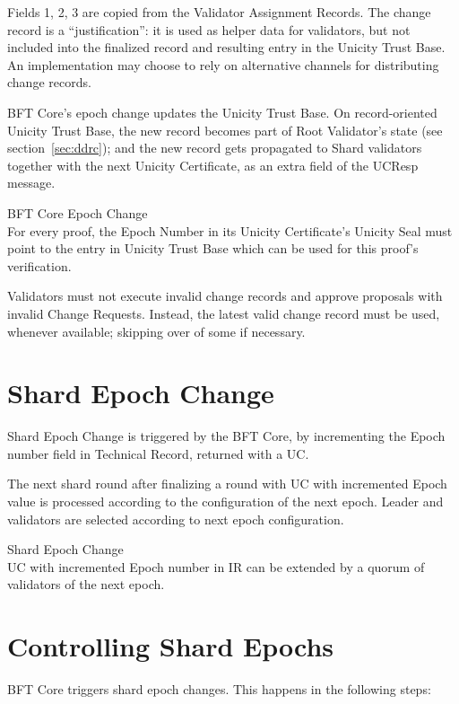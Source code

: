 Fields 1, 2, 3 are copied from the Validator Assignment Records. The change record is a ``justification'': it is used as helper data for validators, but not included into the finalized record and resulting entry in the Unicity Trust Base. An implementation may choose to rely on alternative channels for distributing change records.

BFT Core's epoch change updates the Unicity Trust Base. On record-oriented Unicity Trust Base, the new record becomes part of Root Validator's state (see section~\ref{sec:ddrc}); and the new record gets propagated to Shard validators together with the next Unicity Certificate, as an extra field of the UCResp message.

\begin{ruledef*}{BFT Core Epoch Change} \\
  For every proof, the Epoch Number in its Unicity Certificate's Unicity Seal must point to the entry in Unicity Trust Base which can be used for this proof's verification.
\end{ruledef*}

Validators must not execute invalid change records and approve proposals with invalid Change Requests. Instead, the latest valid change record must be used, whenever available; skipping over of some if necessary.


\section{Shard Epoch Change}

Shard Epoch Change is triggered by the BFT Core, by incrementing the Epoch number field in Technical Record, returned with a UC.

The next shard round after finalizing a round with UC with incremented Epoch value is processed according to the configuration of the next epoch. Leader and validators are selected according to next epoch configuration.

\begin{ruledef*}{Shard Epoch Change} \\
  UC with incremented Epoch number in IR can be extended by a quorum of validators of the next epoch.
\end{ruledef*}

\section{Controlling Shard Epochs}

BFT Core triggers shard epoch changes. This happens in the following steps:

